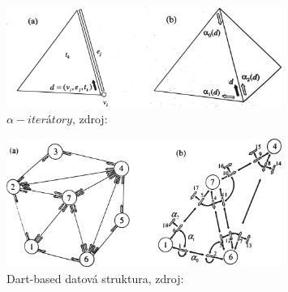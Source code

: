 \documentclass[12pt,a4paper]{article}
\begin{document}
\begin{figure}[h!]
\centering
\includegraphics[width=0.8\textwidth]{img/iterators.png}
\caption{$\alpha-iterátory $, zdroj: \cite{triangulation}}
\label{fig:iterators}
\end{figure}

\newpage
\begin{figure}[h!]
\centering
\includegraphics[width=0.8\textwidth]{img/dart_struct.png}
\caption{Dart-based datová struktura, zdroj: \cite{triangulation}}
\label{fig:dart_struct}
\end{figure}
\end{document}
